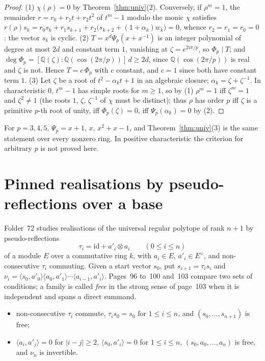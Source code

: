 \documentclass[11pt,a4paper]{amsart}
\theoremstyle{definition}
\theoremstyle{remark}
\newcommand{\Q}{\mathbb Q}
\newcommand{\id}{\mathrm{id}}
\begin{document}
\begin{proof}
(1) $\chi(\rho) = 0$ by Theorem~\ref{thm:univ}(2). Conversely, if $\rho^m = 1$, the remainder $r = r_0 + r_1t + r_2t^2$ of $t^m - 1$ modulo the monic $\chi$ satisfies $r(\rho)s_k = r_0s_k + r_1s_{k+1} + r_2\bigl(s_{k+2} + (1+\alpha_k)w_k\bigr) = 0$, whence $r_2 = r_1 = r_0 = 0$: the vector $s_k$ is cyclic. (2) $T = x^d\Psi_p(x + x^{-1})$ is an integer polynomial of degree at most $2d$ and constant term $1$, vanishing at $\zeta = e^{2i\pi/p}$, so $\Phi_p \mid T$; and $\deg\Phi_p = [\Q(\zeta):\Q(\cos(2\pi/p))]\,d \ge 2d$, since $\Q(\cos(2\pi/p))$ is real and $\zeta$ is not. Hence $T = c\,\Phi_p$ with $c$ constant, and $c = 1$ since both have constant term $1$. (3) Let $\zeta$ be a root of $t^2 - \alpha_kt + 1$ in an algebraic closure; $\alpha_k = \zeta + \zeta^{-1}$. In characteristic $0$, $t^m - 1$ has simple roots for $m \ge 1$, so by (1) $\rho^m = 1$ iff $\zeta^m = 1$ and $\zeta^2 \ne 1$ (the roots $1$, $\zeta$, $\zeta^{-1}$ of $\chi$ must be distinct); thus $\rho$ has order $p$ iff $\zeta$ is a primitive $p$-th root of unity, iff $\Phi_p(\zeta) = 0$, iff $\Psi_p(\alpha_k) = 0$ by (2).
\end{proof}

For $p = 3, 4, 5$, $\Psi_p = x + 1$, $x$, $x^2 + x - 1$, and Theorem~\ref{thm:univ}(3) is the same statement over every nonzero ring. In positive characteristic the criterion for arbitrary $p$ is not proved here.

\section{Pinned realisations by pseudo-reflections over a base}\label{sec:pinned}

Folder~72 studies realisations of the universal regular polytope of rank $n+1$ by pseudo-reflections
\[
\tau_i = \id + a'_i \otimes a_i \qquad (0 \le i \le n)
\]
of a module $E$ over a commutative ring $k$, with $a_i \in E$, $a'_i \in E^\vee$, and non-consecutive $\tau_i$ commuting. Given a start vector $s_0$, put $s_{i+1} = \tau_is_i$ and $\nu_i = \langle s_0, a'_0\rangle\langle a_0, a'_1\rangle\cdots\langle a_{i-1}, a'_i\rangle$. Pages~96 to~100 and~103 compare two sets of conditions; a family is called \emph{free} in the strong sense of page~103 when it is independent and spans a direct summand.
\begin{itemize}[leftmargin=2.5em]
\item[(A)] non-consecutive $\tau_i$ commute, $\tau_is_0 = s_0$ for $1 \le i \le n$, and $(s_0, \dots, s_{n+1})$ is free;
\item[(B)] $\langle a_i, a'_j\rangle = 0$ for $|i - j| \ge 2$, $\langle s_0, a'_i\rangle = 0$ for $1 \le i \le n$, $(s_0, a_0, \dots, a_n)$ is free, and $\nu_n$ is invertible.
\end{itemize}
\end{document}
